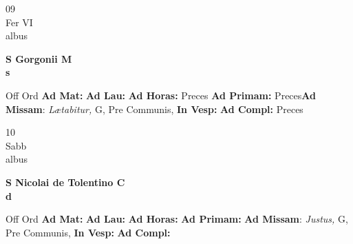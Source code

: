 \documentclass[10pt, openany]{book}
\begin{document}
    \begin{center}
        \begin{minipage}{3.5in}
            \vspace{2em}
            \begin{minipage}{0.5in}
                {\Huge 09} \\
                {\normalsize Fer VI} \\
                {\normalsize albus}
            \end{minipage}
            \begin{minipage}{3.0in}
                \textbf{ \large S Gorgonii M \\
                \textnormal{\normalsize s}} \\ 
            \end{minipage}
            \begin{justify}Off Ord
                \textbf{Ad Mat: }
                \textbf{Ad Lau: }
                \textbf{Ad Horas: }Preces
                \textbf{Ad Primam: }Preces\textbf{Ad Missam}: \textit{Lætabitur,} G, Pre Communis,  
                \textbf{In Vesp: }
                \textbf{Ad Compl: }Preces
            \end{justify}
        \end{minipage}
    \end{center}

    \begin{center}
        \begin{minipage}{3.5in}
            \vspace{2em}
            \begin{minipage}{0.5in}
                {\Huge 10} \\
                {\normalsize Sabb} \\
                {\normalsize albus}
            \end{minipage}
            \begin{minipage}{3.0in}
                \textbf{ \large S Nicolai de Tolentino C \\
                \textnormal{\normalsize d}} \\ 
            \end{minipage}
            \begin{justify}Off Ord
                \textbf{Ad Mat: }
                \textbf{Ad Lau: }
                \textbf{Ad Horas: }
                \textbf{Ad Primam: }\textbf{Ad Missam}: \textit{Justus,} G, Pre Communis,  
                \textbf{In Vesp: }
                \textbf{Ad Compl: }
            \end{justify}
        \end{minipage}
    \end{center}
\end{document}

